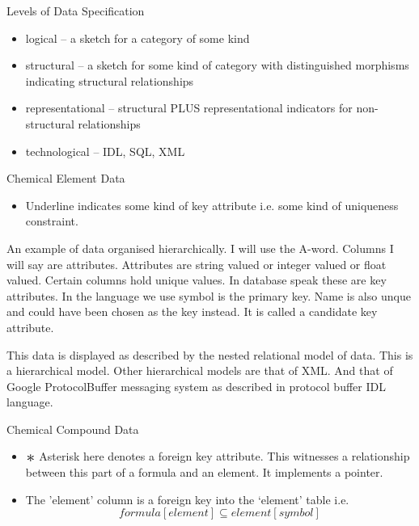\begin{frame}{Levels of Data Specification}
\begin{itemize}
\item logical   -- a sketch for a category of some kind
\item structural -- a sketch for some kind of category with distinguished morphisms indicating structural relationships
\item representational -- structural PLUS representational indicators for non-structural relationships
\item technological    -- IDL, SQL, XML 
\end{itemize}
\end{frame}

\begin{frame}{Chemical Element Data}
\scalebox{0.75}{

}

\begin{itemize}
	\item Underline indicates some kind of key attribute i.e. some kind of uniqueness constraint.
\end{itemize}
An example of data organised hierarchically. 
I will use the A-word. Columns I will say are attributes. Attributes are string valued or integer valued or float  valued.
Certain columns hold unique values. In database speak these are key attributes. In the language we use
symbol is the primary key. Name is also unque and could have been chosen as the key instead. It is called a candidate key attribute.


This data is displayed as described by the nested relational model of data. This is a hierarchical model.
Other hierarchical models are that of XML. And that of Google ProtocolBuffer messaging system as described in protocol buffer IDL language.
\end{frame}

\begin{frame}{Chemical Compound Data}
\scalebox{0.75}{

}
\begin{itemize}
\item $\largeAsterisk$ Asterisk here denotes a foreign key attribute. 
\pause This witnesses a relationship between this part of a formula and an element. \pause It implements a pointer.
	\item The 'element' column is a foreign key into the `element' table i.e.
	\begin{equation}
	              formula[element] \subseteq element[symbol]
	\end{equation}
\end{itemize}	
\end{frame}

